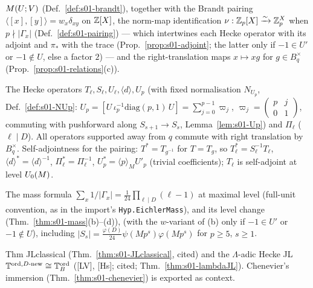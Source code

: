 \begin{interface}\label{if:s01-brandt}
$M(U;V)$ (Def.~\ref{def:s01-brandt}), together with the Brandt pairing $\langle[x],[y]\rangle=w_x\delta_{xy}$ on $\mathbb{Z}[X]$,
the norm-map identification $\nu:\mathbb{Z}_p[X]\xrightarrow{\sim}\mathbb{Z}_p^X$ when $p\nmid|\Gamma_x|$ (Def.~\ref{def:s01-pairing}) --- which
intertwines each Hecke operator with its adjoint and $\pi_*$ with the trace (Prop.~\ref{prop:s01-adjoint}; the latter only if
$-1\in U'$ or $-1\notin U$, else a factor $2$) --- and the
right-translation maps $x\mapsto xg$ for $g\in B_q^\times$ (Prop.~\ref{prop:s01-relations}(c)).
\end{interface}

\begin{interface}\label{if:s01-hecke}
The Hecke operators $T_\ell,S_\ell,U_\ell,\langle d\rangle,U_p$ (with fixed normalisation $N_{U_p}$, Def.~\ref{def:s01-NUp}:
$U_p=[U\,\iota_p^{-1}\mathrm{diag}(p,1)\,U]=\sum_{j=0}^{p-1}\varpi_j$, $\varpi_j=\left(\begin{smallmatrix}p&j\\0&1\end{smallmatrix}\right)$, commuting
with pushforward along $S_{s+1}\to S_s$, Lemma~\ref{lem:s01-Up}) and $\Pi_\ell$ ($\ell\mid D$). All operators supported away from
$q$ commute with right translation by $B_q^\times$. Self-adjointness for the pairing: $T^*=T_{g^{-1}}$ for $T=T_g$, so
$T_\ell^*=S_\ell^{-1}T_\ell$, $\langle d\rangle^*=\langle d\rangle^{-1}$, $\Pi_\ell^*=\Pi_\ell^{-1}$, $U_p^*=\langle p\rangle_MU'_p$
(trivial coefficients); $T_\ell$ is self-adjoint at level $U_0(M)$.
\end{interface}

\begin{interface}\label{if:s01-mass}
The mass formula $\sum_x1/|\Gamma_x|=\frac1{24}\prod_{\ell\mid D}(\ell-1)$ at maximal level (full-unit convention, as in the import's
\texttt{Hyp.EichlerMass}), and its level change (Thm.~\ref{thm:s01-mass}(b)--(d)), (with the $w$-variant of (b) only if $-1\in U'$ or $-1\notin U$), including
$|S_s|=\frac{\varphi(D)}{24}\psi(Mp^s)\varphi(Mp^s)$ for $p\ge5$, $s\ge1$.
\end{interface}

\begin{interface}\label{if:s01-targets}
Thm JLclassical (Thm.~\ref{thm:s01-JLclassical}, cited) and the $\Lambda$-adic Hecke JL $\mathbb{T}^{\mathrm{ord},D\text{-new}}\cong\mathbb{T}^{\mathrm{ord}}_B$
([LV], [Hs]; cited; Thm.~\ref{thm:s01-lambdaJL}). Chenevier's immersion (Thm.~\ref{thm:s01-chenevier}) is exported as context.
\end{interface}

